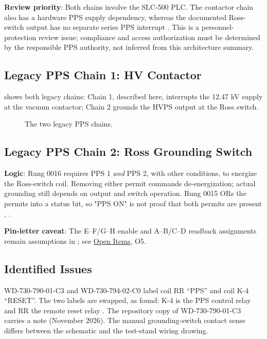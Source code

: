 \textbf{Review priority}: Both chains involve the SLC-500 PLC. The contactor chain also has a hardware PPS supply dependency, whereas the documented Ross-switch output has no separate series PPS interrupt . This is a personnel-protection review issue; compliance and access authorization must be determined by the responsible PPS authority, not inferred from this architecture summary.

\subsection{Legacy PPS Chain 1: HV Contactor}

 shows both legacy chains: Chain 1, described here, interrupts the 12.47 kV supply at the vacuum contactor; Chain 2 grounds the HVPS output at the Ross switch.

\begin{figure}[p]\centering
\begin{fitpicture}\end{fitpicture}
\caption{The two legacy PPS chains.}\label{fig:pps-chains}
\end{figure}
\clearpage

\subsection{Legacy PPS Chain 2: Ross Grounding Switch}

\begin{keynote}
\textbf{Logic}: Rung 0016 requires PPS 1 \emph{and} PPS 2, with other conditions, to energize the Ross-switch coil. Removing either permit commands de-energization; actual grounding still depends on output and switch operation. Rung 0015 ORs the permits into a status bit, so "PPS ON" is not proof that both permits are present , .
\end{keynote}

\begin{keynote}
\textbf{Pin-letter caveat}: The E--F/G--H enable and A--B/C--D readback assignments remain assumptions in ; see \hyperref[sec:open-items]{Open Items}, O5.
\end{keynote}

\subsection{Identified Issues}

WD-730-790-01-C3  and WD-730-794-02-C0  label coil RR ``PPS'' and coil K-4 ``RESET''. The two labels are swapped, as  found: K-4 is the PPS control relay and RR the remote reset relay . The repository copy of WD-730-790-01-C3 carries a note (November 2026).
The manual grounding-switch contact sense differs between the schematic and the test-stand wiring drawing.

